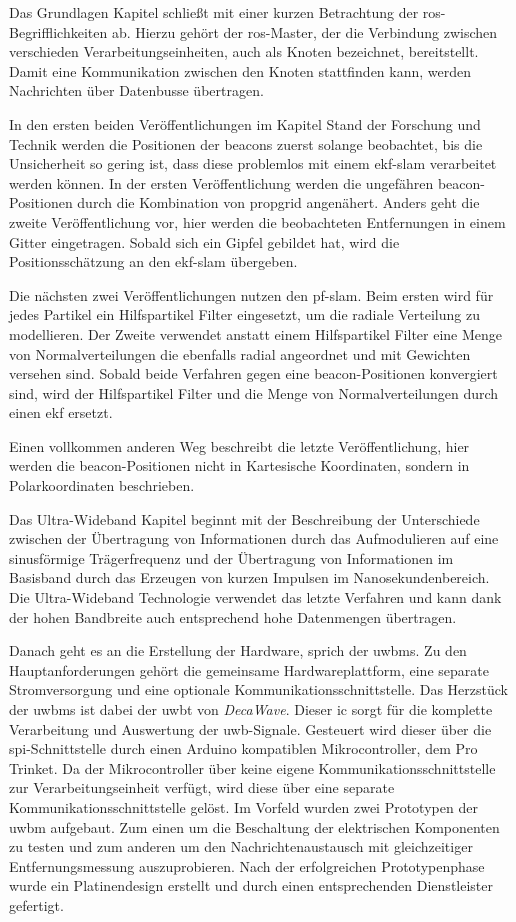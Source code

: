 Das Grundlagen Kapitel schließt mit einer kurzen Betrachtung der \gls{ros}-Begrifflichkeiten ab. Hierzu gehört der \gls{ros}-Master, der die Verbindung zwischen verschieden Verarbeitungseinheiten, auch als Knoten bezeichnet, bereitstellt. Damit eine Kommunikation zwischen den Knoten stattfinden kann, werden Nachrichten über Datenbusse übertragen.

In den ersten beiden Veröffentlichungen im Kapitel Stand der Forschung und Technik werden die Positionen der \glspl{beacon} zuerst solange beobachtet, bis die Unsicherheit so gering ist, dass diese problemlos mit einem \gls{ekf}-\gls{slam} verarbeitet werden können. In der ersten Veröffentlichung werden die ungefähren \gls{beacon}-Positionen durch die Kombination von \gls{propgrid} angenähert. Anders geht die zweite Veröffentlichung vor, hier werden die beobachteten Entfernungen in einem Gitter eingetragen. Sobald sich ein Gipfel gebildet hat, wird die Positionsschätzung an den \gls{ekf}-\gls{slam} übergeben.

Die nächsten zwei Veröffentlichungen nutzen den \gls{pf}-\gls{slam}. Beim ersten wird für jedes Partikel ein Hilfspartikel Filter eingesetzt, um die radiale Verteilung zu modellieren. Der Zweite verwendet anstatt einem Hilfspartikel Filter eine Menge von Normalverteilungen die ebenfalls radial angeordnet und mit Gewichten versehen sind. Sobald beide Verfahren gegen eine \gls{beacon}-Positionen konvergiert sind, wird der Hilfspartikel Filter und die Menge von Normalverteilungen durch einen \gls{ekf} ersetzt.

Einen vollkommen anderen Weg beschreibt die letzte Veröffentlichung, hier werden die \gls{beacon}-Positionen nicht in Kartesische Koordinaten, sondern in Polarkoordinaten beschrieben.

Das Ultra-Wideband Kapitel beginnt mit der Beschreibung der Unterschiede zwischen der Übertragung von Informationen durch das Aufmodulieren auf eine sinusförmige Trägerfrequenz und der Übertragung von Informationen im Basisband durch das Erzeugen von kurzen Impulsen im Nanosekundenbereich. Die Ultra-Wideband Technologie verwendet das letzte Verfahren und kann dank der hohen Bandbreite auch entsprechend hohe Datenmengen übertragen.

Danach geht es an die Erstellung der Hardware, sprich der \glspl{uwbm}. Zu den Hauptanforderungen gehört die gemeinsame Hardwareplattform, eine separate Stromversorgung und eine optionale Kommunikationsschnittstelle. Das Herzstück der \glspl{uwbm} ist dabei der \gls{uwbt} von \textit{DecaWave}. Dieser \gls{ic} sorgt für die komplette Verarbeitung und Auswertung der \gls{uwb}-Signale. Gesteuert wird dieser über die \gls{spi}-Schnittstelle durch einen Arduino kompatiblen Mikrocontroller, dem Pro Trinket. Da der Mikrocontroller über keine eigene Kommunikationsschnittstelle zur Verarbeitungseinheit verfügt, wird diese über eine separate Kommunikationsschnittstelle gelöst. Im Vorfeld wurden zwei Prototypen der \gls{uwbm} aufgebaut. Zum einen um die Beschaltung der elektrischen Komponenten zu testen und zum anderen um den Nachrichtenaustausch mit gleichzeitiger Entfernungsmessung auszuprobieren. Nach der erfolgreichen Prototypenphase wurde ein Platinendesign erstellt und durch einen entsprechenden Dienstleister gefertigt.

